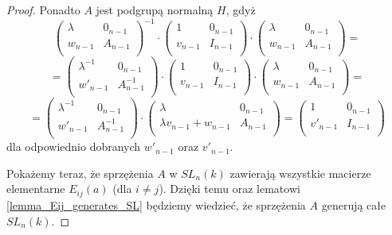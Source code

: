 \documentclass[licencjacka]{pracamgr}
\begin{document}
\begin{proof}
  Ponadto $A$ jest podgrupą normalną $H$, gdyż
  $$
    \left( \begin{array}{cc} \lambda & 0_{n-1} \\ w_{n-1} & A_{n-1} \\ \end{array} \right)^{-1} \cdot
    \left( \begin{array}{cc} 1 & 0_{n-1} \\ v_{n-1} & I_{n-1} \\ \end{array} \right)  \cdot
    \left( \begin{array}{cc} \lambda & 0_{n-1} \\ w_{n-1} & A_{n-1} \\ \end{array} \right) = 
  $$
  $$ = 
    \left( \begin{array}{cc} \lambda^{-1} & 0_{n-1} \\ w'_{n-1} & A^{-1}_{n-1} \\ \end{array} \right) \cdot
    \left( \begin{array}{cc} 1 & 0_{n-1} \\ v_{n-1} & I_{n-1} \\ \end{array} \right)  \cdot
    \left( \begin{array}{cc} \lambda & 0_{n-1} \\ w_{n-1} & A_{n-1} \\ \end{array} \right) = 
  $$
  $$ = 
    \left( \begin{array}{cc} \lambda^{-1} & 0_{n-1} \\ w'_{n-1} & A^{-1}_{n-1} \\ \end{array} \right) \cdot
    \left( \begin{array}{cc} \lambda & 0_{n-1} \\ \lambda v_{n-1} + w_{n-1} & A_{n-1} \\ \end{array} \right) = 
    \left( \begin{array}{cc} 1 & 0_{n-1} \\ v'_{n-1} & I_{n-1} \\ \end{array} \right)  
  $$
  dla odpowiednio dobranych $w'_{n-1}$ oraz $v'_{n-1}$.

  Pokażemy teraz, że sprzężenia $A$ w $SL_n(k)$ zawierają wszystkie macierze elementarne $E_{i j}(a)$ (dla $i \ne j$).
  Dzięki temu oraz lematowi \ref{lemma_Eij_generates_SL} będziemy wiedzieć, że sprzężenia $A$ generują całe $SL_n(k)$.


\end{proof}
\end{document}
